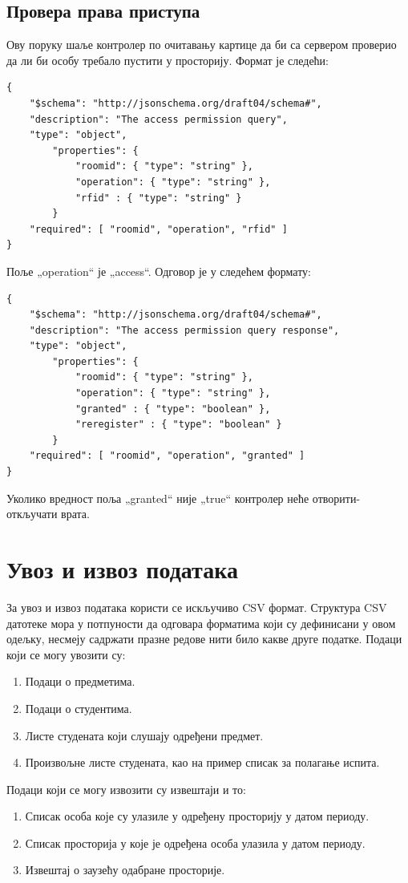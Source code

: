 \documentclass[a4paper, 12pt, diplomski]{etfcyr}
\def\quote#1{„#1“}
\begin{document}
			\subsection{Провера права приступа}
				\begin{justify}
					Ову поруку шаље контролер по очитавању картице да би са сервером проверио да ли би особу требало пустити у просторију. Формат је следећи:
					\begin{lstlisting}[caption=Формат захтева за проверу права приступа]
{
	"$schema": "http://json­schema.org/draft­04/schema#",
	"description": "The access permission query",
	"type": "object",
		"properties": {
			"room­id": { "type": "string" },
			"operation": { "type": "string" },
			"rfid" : { "type": "string" }
		}
	"required": [ "room­id", "operation", "rfid" ]
}
					\end{lstlisting}
					Поље \quote{operation} је \quote{access}. Одговор је у следећем формату:
					\begin{lstlisting}[caption=Формат одговора на захтев за проверу права приступа]
{
	"$schema": "http://json­schema.org/draft­04/schema#",
	"description": "The access permission query response",
	"type": "object",
		"properties": {
			"room­id": { "type": "string" },
			"operation": { "type": "string" },
			"granted" : { "type": "boolean" },
			"reregister" : { "type": "boolean" }
		}
	"required": [ "room­id", "operation", "granted" ]
}
					\end{lstlisting}
					Уколико вредност поља \quote{granted} није \quote{true} контролер неће отворити-откључати врата.
				\end{justify}

		\section{Увоз и извоз података}
			\begin{justify}
				За увоз и извоз података користи се искључиво CSV формат. Структура CSV датотеке мора у потпуности да одговара форматима који су дефинисани у овом одељку, несмеју садржати празне редове нити било какве друге податке. Подаци који се могу увозити су:
				\begin{enumerate}[noitemsep]
					\item Подаци о предметима.
					\item Подаци о студентима.
					\item Листе студената који слушају одређени предмет.
					\item Произвољне листе студената, као на пример списак за полагање испита.
				\end{enumerate}
				Подаци који се могу извозити су извештаји и то:
				\begin{enumerate}[noitemsep]
					\item Списак особа које су улазиле у одређену просторију у датом периоду.
					\item Списак просторија у које је одређена особа улазила у датом периоду.
					\item Извештај о заузећу одабране просторије.
				\end{enumerate}
			\end{justify}
\end{document}
